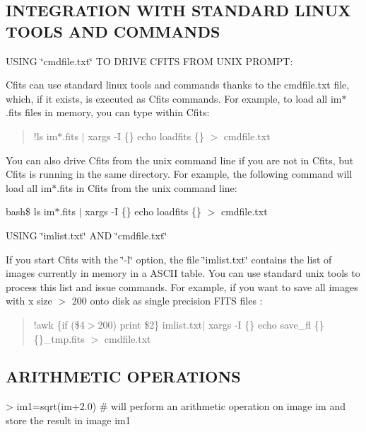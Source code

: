 \subsection*{I\+N\+T\+E\+G\+R\+A\+T\+I\+O\+N W\+I\+T\+H S\+T\+A\+N\+D\+A\+R\+D L\+I\+N\+U\+X T\+O\+O\+L\+S A\+N\+D C\+O\+M\+M\+A\+N\+D\+S}

U\+S\+I\+N\+G \char`\"{}cmdfile.\+txt\char`\"{} T\+O D\+R\+I\+V\+E C\+F\+I\+T\+S F\+R\+O\+M U\+N\+I\+X P\+R\+O\+M\+P\+T\+:

Cfits can use standard linux tools and commands thanks to the cmdfile.\+txt file, which, if it exists, is executed as Cfits commands. For example, to load all im$\ast$.fits files in memory, you can type within Cfits\+:

\begin{quote}
!ls im$\ast$.fits $\vert$ xargs -\/\+I \{\} echo loadfits \{\} $>$ cmdfile.\+txt \end{quote}


You can also drive Cfits from the unix command line if you are not in Cfits, but Cfits is running in the same directory. For example, the following command will load all im$\ast$.fits in Cfits from the unix command line\+:

bash\$ ls im$\ast$.fits $\vert$ xargs -\/\+I \{\} echo loadfits \{\} $>$ cmdfile.\+txt

U\+S\+I\+N\+G \char`\"{}imlist.\+txt\char`\"{} A\+N\+D \char`\"{}cmdfile.\+txt\char`\"{}

If you start Cfits with the \char`\"{}-\/l\char`\"{} option, the file \char`\"{}imlist.\+txt\char`\"{} contains the list of images currently in memory in a A\+S\+C\+I\+I table. You can use standard unix tools to process this list and issue commands. For example, if you want to save all images with x size $>$ 200 onto disk as single precision F\+I\+T\+S files \+:

\begin{quote}
!awk \textquotesingle{}\{if (\$4$>$200) print \$2\}\textquotesingle{} imlist.\+txt$\vert$ xargs -\/\+I \{\} echo save\+\_\+fl \{\} \{\}\+\_\+tmp.\+fits $>$ cmdfile.\+txt \end{quote}


\subsection*{A\+R\+I\+T\+H\+M\+E\+T\+I\+C O\+P\+E\+R\+A\+T\+I\+O\+N\+S}

\begin{DoxyVerb}> im1=sqrt(im+2.0)          
    # will perform an arithmetic operation on image im and store the result in image im1
\end{DoxyVerb}
 